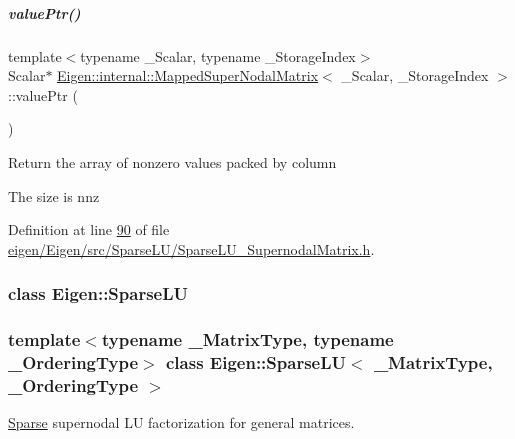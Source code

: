 \mbox{\label{group___sparse_l_u___module_a6e9ce7d448b76811802d11baf3da97d3}} 
\subparagraph{\texorpdfstring{value\+Ptr()}{valuePtr()}\hspace{0.1cm}{\footnotesize\ttfamily [2/2]}}
{\footnotesize\ttfamily template$<$typename \+\_\+\+Scalar, typename \+\_\+\+Storage\+Index$>$ \\
Scalar$\ast$ \hyperlink{group___sparse_l_u___module_class_eigen_1_1internal_1_1_mapped_super_nodal_matrix}{Eigen\+::internal\+::\+Mapped\+Super\+Nodal\+Matrix}$<$ \+\_\+\+Scalar, \+\_\+\+Storage\+Index $>$\+::value\+Ptr (\begin{DoxyParamCaption}{ }\end{DoxyParamCaption})\hspace{0.3cm}{\ttfamily [inline]}}

Return the array of nonzero values packed by column

The size is nnz 

Definition at line \hyperlink{eigen_2_eigen_2src_2_sparse_l_u_2_sparse_l_u___supernodal_matrix_8h_source_l00090}{90} of file \hyperlink{eigen_2_eigen_2src_2_sparse_l_u_2_sparse_l_u___supernodal_matrix_8h_source}{eigen/\+Eigen/src/\+Sparse\+L\+U/\+Sparse\+L\+U\+\_\+\+Supernodal\+Matrix.\+h}.

\label{class_eigen_1_1_sparse_l_u}
\subsubsection{class Eigen\+:\+:Sparse\+LU}
\subsubsection*{template$<$typename \+\_\+\+Matrix\+Type, typename \+\_\+\+Ordering\+Type$>$\newline
class Eigen\+::\+Sparse\+L\+U$<$ \+\_\+\+Matrix\+Type, \+\_\+\+Ordering\+Type $>$}

\hyperlink{struct_eigen_1_1_sparse}{Sparse} supernodal LU factorization for general matrices. 

